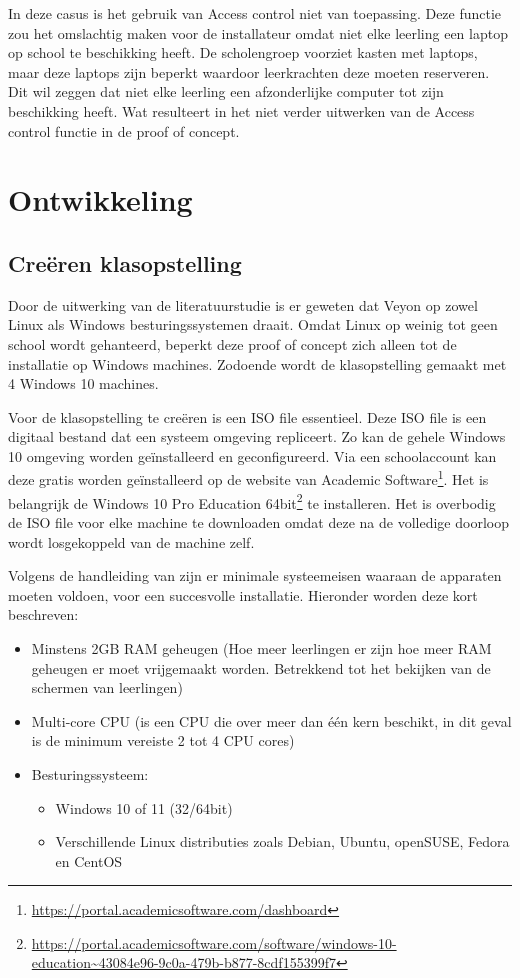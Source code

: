  In deze casus is het gebruik van Access control niet van toepassing. Deze functie zou het omslachtig maken voor de installateur omdat niet elke leerling een laptop op school te beschikking heeft. De scholengroep voorziet kasten met laptops, maar deze laptops zijn beperkt waardoor leerkrachten deze moeten reserveren. Dit wil zeggen dat niet elke leerling een afzonderlijke computer tot zijn beschikking heeft. Wat resulteert in het niet verder uitwerken van de Access control functie in de proof of concept.
 
\section{Ontwikkeling}
\subsection{Creëren klasopstelling}
\label{creërenklasopstelling}
Door de uitwerking van de literatuurstudie is er geweten dat Veyon op zowel Linux als Windows besturingssystemen draait. Omdat Linux op weinig tot geen school wordt gehanteerd, beperkt deze proof of concept zich alleen tot de installatie op Windows machines. Zodoende wordt de klasopstelling gemaakt met 4 Windows 10 machines. \newline

Voor de klasopstelling te creëren is een ISO file essentieel. Deze ISO file is een digitaal bestand dat een systeem omgeving repliceert. Zo kan de gehele Windows 10 omgeving worden geïnstalleerd en geconfigureerd. Via een schoolaccount kan deze gratis worden geïnstalleerd op de website van Academic Software\footnote{\url{https://portal.academicsoftware.com/dashboard}}. Het is belangrijk de Windows 10 Pro Education 64bit\footnote{\url{https://portal.academicsoftware.com/software/windows-10-education~43084e96-9c0a-479b-b877-8cdf155399f7}} te installeren. Het is overbodig de ISO file voor elke machine te downloaden omdat deze na de volledige doorloop wordt losgekoppeld van de machine zelf. \newline

Volgens de handleiding van \textcite{veyonrequirements} zijn er minimale systeemeisen waaraan de apparaten moeten voldoen, voor een succesvolle installatie. Hieronder worden deze kort beschreven:
\begin{itemize}
    \item Minstens 2GB RAM geheugen (Hoe meer leerlingen er zijn hoe meer RAM geheugen er moet vrijgemaakt worden. Betrekkend tot het bekijken van de schermen van leerlingen)
    \item Multi-core CPU (is een CPU die over meer dan één kern beschikt, in dit geval is de minimum vereiste 2 tot 4 CPU cores)
    \item Besturingssysteem: \begin{itemize}
        \item Windows 10 of 11 (32/64bit)
        \item Verschillende Linux distributies zoals Debian, Ubuntu, openSUSE, Fedora en CentOS   
    \end{itemize}
\end{itemize}

